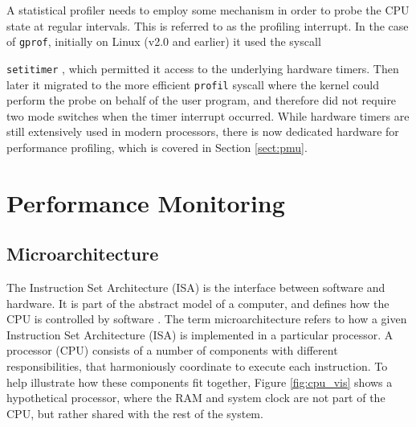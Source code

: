 A statistical profiler needs to employ some mechanism in order to probe the CPU state at regular intervals. This is referred to as the profiling interrupt. In the case of \texttt{gprof}, initially on Linux (v2.0 and earlier) it used the syscall {\texttt{setitimer} \cite{DocsGProfImpl}, which permitted it access to the underlying hardware timers. Then later it migrated to the more efficient \texttt{profil} syscall where the kernel could perform the probe on behalf of the user program, and therefore did not require two mode switches when the timer interrupt occurred. While hardware timers are still extensively used in modern processors, there is now dedicated hardware for performance profiling, which is covered in Section \ref{sect:pmu}.

\section{Performance Monitoring}

\subsection{Microarchitecture}

The Instruction Set Architecture (ISA) is the interface between software and hardware. It is part of the abstract model of a computer, and defines how the CPU is controlled by software \cite{GlossArmISA}. The term microarchitecture refers to how a given Instruction Set Architecture (ISA) is implemented in a particular processor. A processor (CPU) consists of a number of components with different responsibilities, that harmoniously coordinate to execute each instruction. To help illustrate how these components fit together, Figure \ref{fig:cpu_vis} shows a hypothetical processor, where the RAM and system clock are not part of the CPU, but rather shared with the rest of the system.

}
